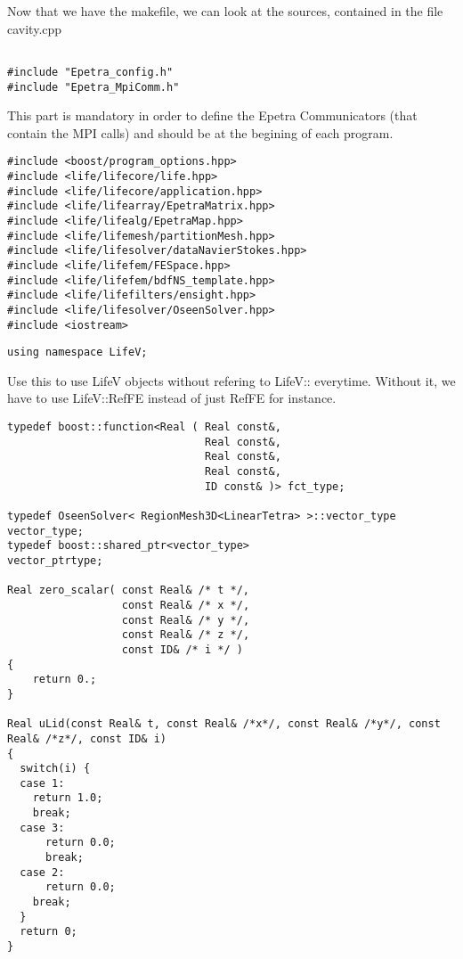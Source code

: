Now that we have the makefile, we can look at the sources, contained in the file cavity.cpp


\begin{verbatim}

#include "Epetra_config.h"
#include "Epetra_MpiComm.h"

\end{verbatim}

This part is mandatory in order to define the Epetra Communicators (that contain the MPI calls) 
 and should be
at the begining of each program.


\begin{verbatim}
#include <boost/program_options.hpp>
#include <life/lifecore/life.hpp>
#include <life/lifecore/application.hpp>
#include <life/lifearray/EpetraMatrix.hpp>
#include <life/lifealg/EpetraMap.hpp>
#include <life/lifemesh/partitionMesh.hpp>
#include <life/lifesolver/dataNavierStokes.hpp>
#include <life/lifefem/FESpace.hpp>
#include <life/lifefem/bdfNS_template.hpp>
#include <life/lifefilters/ensight.hpp>
#include <life/lifesolver/OseenSolver.hpp>
#include <iostream>
\end{verbatim}



\begin{verbatim}
using namespace LifeV;
\end{verbatim}

Use this to use LifeV objects  without refering to LifeV:: everytime.
Without it, we have to use LifeV::RefFE instead of just RefFE for instance.


\begin{verbatim}
typedef boost::function<Real ( Real const&,
                               Real const&,
                               Real const&,
                               Real const&,
                               ID const& )> fct_type;

typedef OseenSolver< RegionMesh3D<LinearTetra> >::vector_type  vector_type;
typedef boost::shared_ptr<vector_type>                   vector_ptrtype;

Real zero_scalar( const Real& /* t */,
                  const Real& /* x */,
                  const Real& /* y */,
                  const Real& /* z */,
                  const ID& /* i */ )
{
    return 0.;
}

Real uLid(const Real& t, const Real& /*x*/, const Real& /*y*/, const Real& /*z*/, const ID& i)
{
  switch(i) {
  case 1:
    return 1.0;
    break;
  case 3:
      return 0.0;
      break;
  case 2:
      return 0.0;
    break;
  }
  return 0;
}

\end{verbatim}


